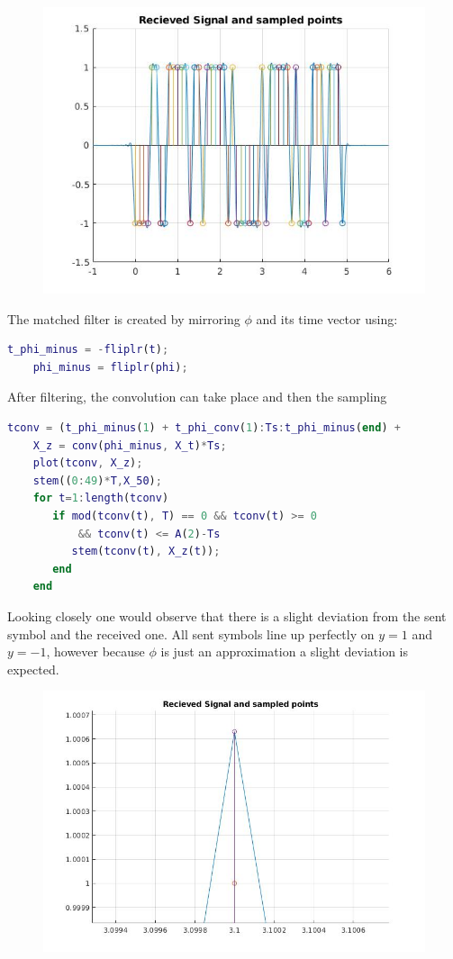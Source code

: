 \documentclass[12pt, a4paper]{article}
\begin{document}
\begin{enumerate}
\begin{figure}[H]
\centering
\noindent\includegraphics[width=\textwidth]{matched_filt.jpg}
\end{figure}
\pagebreak
The matched filter is created by mirroring $\phi$ and its time vector using:
\begin{lstlisting}[language=MATLAB]
    t_phi_minus = -fliplr(t);
    phi_minus = fliplr(phi);
\end{lstlisting}


After filtering, the convolution can take place and then the sampling
\begin{lstlisting}[language=MATLAB]
    tconv = (t_phi_minus(1) + t_phi_conv(1):Ts:t_phi_minus(end) +                        t_phi_conv(end));
    X_z = conv(phi_minus, X_t)*Ts;
    plot(tconv, X_z);
    stem((0:49)*T,X_50);
    for t=1:length(tconv)
       if mod(tconv(t), T) == 0 && tconv(t) >= 0 
           && tconv(t) <= A(2)-Ts
          stem(tconv(t), X_z(t)); 
       end
    end
\end{lstlisting}
\pagebreak
Looking closely one would observe that there is a slight deviation from the sent symbol and the received one. All sent symbols line up perfectly on $y=1$ and $y=-1$, however because $\phi$ is just an approximation a slight deviation is expected.
\begin{figure}[H]
\centering
\noindent\includegraphics[width=\textwidth]{deviation.jpg}
\end{figure}
\end{enumerate}
\begin{lstlisting}[language=MATLAB]
    
    
\end{lstlisting}
\end{document}
